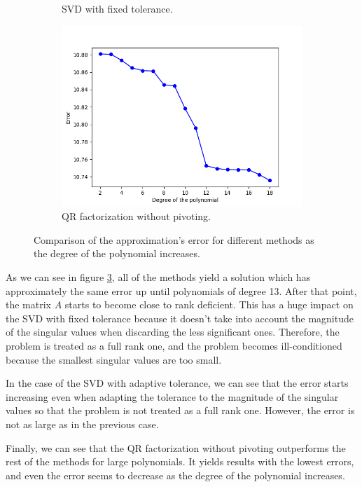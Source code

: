 \documentclass[11pt,a4paper]{article}
\begin{document}
\begin{figure}[H]
\begin{subfigure}[t]{.5\textwidth}
    \caption{SVD with fixed tolerance.}
    \label{fig:lsp-svd-fix-tol}
  \end{subfigure}
  \begin{subfigure}[t]{.5\textwidth}
    \centering
    \includegraphics[scale=0.4]{img/lsp_qr}
    \caption{QR factorization without pivoting.}
    \label{fig:lsp-qr}
  \end{subfigure}
  \caption{Comparison of the approximation's error for different methods as the degree of
  the polynomial increases.}
  \label{fig:lsp-polynomial}
\end{figure}

As we can see in figure \ref{fig:lsp-polynomial}, all of the methods yield a solution which 
has approximately the same error up until polynomials of degree 13. After that point, the matrix
$A$ starts to become close to rank deficient. This has a huge impact on the SVD with fixed tolerance
because it doesn't take into account the magnitude of the singular values when discarding the less
significant ones. Therefore, the problem is treated as a full rank one, and the problem becomes
ill-conditioned because the smallest singular values are too small.

In the case of the SVD with adaptive tolerance, we can see that the error starts
increasing even when adapting the tolerance to the magnitude of the singular values so that the
problem is not treated as a full rank one. However, the error is not as large as in the previous
case.

Finally, we can see that the QR factorization without pivoting outperforms the rest of
the methods for large polynomials. It yields results with the lowest errors, and even the error seems
to decrease as the degree of the polynomial increases.
\end{document}
